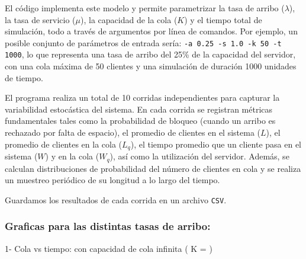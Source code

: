 \documentclass{article}
\begin{document}
El código implementa este modelo y permite parametrizar la tasa de arribo (\( \lambda \)), la tasa de servicio (\( \mu \)), la capacidad de la cola (\( K \)) y el tiempo total de simulación, todo a través de argumentos por línea de comandos. Por ejemplo, un posible conjunto de parámetros de entrada sería: \texttt{-a 0.25 -s 1.0 -k 50 -t 1000}, lo que representa una tasa de arribo del 25\% de la capacidad del servidor, con una cola máxima de 50 clientes y una simulación de duración 1000 unidades de tiempo.

El programa realiza un total de 10 corridas independientes para capturar la variabilidad estocástica del sistema. En cada corrida se registran métricas fundamentales tales como la probabilidad de bloqueo (cuando un arribo es rechazado por falta de espacio), el promedio de clientes en el sistema (\( L \)), el promedio de clientes en la cola (\( L_q \)), el tiempo promedio que un cliente pasa en el sistema (\( W \)) y en la cola (\( W_q \)), así como la utilización del servidor. Además, se calculan distribuciones de probabilidad del número de clientes en cola y se realiza un muestreo periódico de su longitud a lo largo del tiempo.

Guardamos los resultados de cada corrida en un archivo \texttt{CSV}.

\subsubsection{Graficas para las distintas tasas de arribo:}
1- Cola vs tiempo: con capacidad de cola infinita ( K = \infty)
\end{document}
